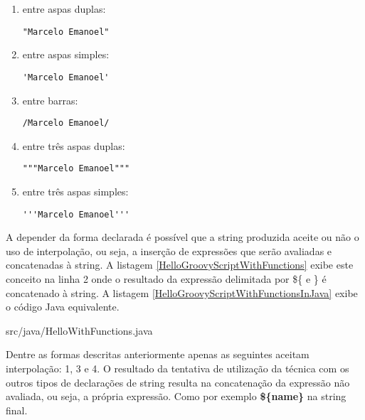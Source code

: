 \documentclass[12pt]{article}
\begin{document}
    \begin{enumerate}
        \item entre aspas duplas: 
            \begin{lstlisting}[style=InlineGroovy]
                "Marcelo Emanoel"
            \end{lstlisting}
        \item entre aspas simples:
            \begin{lstlisting}[style=InlineGroovy]
                'Marcelo Emanoel'
            \end{lstlisting}
        \item entre barras:
            \begin{lstlisting}[style=InlineGroovy]
                /Marcelo Emanoel/
            \end{lstlisting}
        \item entre três aspas duplas: 
            \begin{lstlisting}[style=InlineGroovy]
                """Marcelo Emanoel"""
            \end{lstlisting}
        \item entre três aspas simples:
            \begin{lstlisting}[style=InlineGroovy]
                '''Marcelo Emanoel'''
            \end{lstlisting}

    \end{enumerate}
    
    A depender da forma declarada é possível que a string produzida aceite ou não
    o uso de interpolação, ou seja, a inserção de expressões que serão avaliadas
    e concatenadas à string. A listagem \ref{HelloGroovyScriptWithFunctions} exibe
    este conceito na linha 2 onde o resultado da expressão delimitada por \$\{ e \}
    é concatenado à string. A listagem \ref{HelloGroovyScriptWithFunctionsInJava}
    exibe o código Java equivalente.
    
    
                    {src/java/HelloWithFunctions.java}

    Dentre as formas descritas anteriormente apenas as seguintes aceitam 
    interpolação: 1, 3 e 4. O resultado da tentativa de utilização da técnica com
    os outros tipos de declarações de string resulta na concatenação da expressão
    não avaliada, ou seja, a própria expressão. Como por exemplo \textbf{\$\{name\}}
    na string final. 
\end{document}
